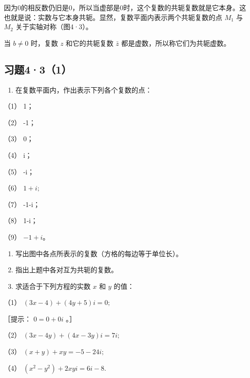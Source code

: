 因为0的相反数仍旧是0，所以当虚部是0时，这个复数的共轭复数就是它本身。这也就是说：实数与它本身共轭。显然，复数平面内表示两个共轭复数的点
\(M_{1}\) 与 \(M_{2}\) 关于实轴对称（图4·3）。


当 \(b \neq 0\) 时，复数 \(z\) 和它的共轭复数 \(\bar{z}\)
都是虚数，所以称它们为共轭虚数。

\subsection{习题4·3（1）}

\begin{enumerate}
\item
  在复数平面内，作出表示下列各个复数的点：
\end{enumerate}

（1） 1；

（2） -1；

（3） 0；

（4） i；

（5） -i；

（6） \(1+i;\)

（7） -1-i；

（8） 1-i；

（9） \(-1 + i\)。

\begin{enumerate}[start=2]
\item
  写出图中各点所表示的复数（方格的每边等于单位长）。
\item
  指出上题中各对互为共轭的复数。
\item
  求适合于下列方程的实数 \(x\) 和 \(y\) 的值：
\end{enumerate}

（1） \((3x - 4) + (4y + 5)i = 0;\)

［提示： \(0=0+0i\) 。］

（2） \((3x - 4y) + (4x - 3y)i = 7i;\)

（3） \((x + y) + xy = -5 - 24i;\)

（4） \((x^{2} - y^{2}) + 2xyi = 6i - 8.\)


